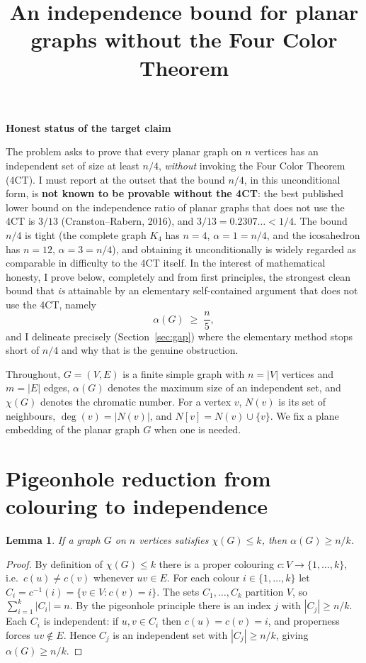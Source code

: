 \documentclass{amsart}
\newtheorem{lemma}{Lemma}
\theoremstyle{remark}
\begin{document}
\title{An independence bound for planar graphs without the Four Color Theorem}
\maketitle

\begin{center}\textbf{Honest status of the target claim}\end{center}

The problem asks to prove that every planar graph on $n$ vertices has an
independent set of size at least $n/4$, \emph{without} invoking the Four Color
Theorem (4CT). I must report at the outset that the bound $n/4$, in this
unconditional form, is \textbf{not known to be provable without the 4CT}: the
best published lower bound on the independence ratio of planar graphs that does
not use the 4CT is $3/13$ (Cranston--Rabern, 2016), and $3/13 = 0.2307\ldots <
1/4$. The bound $n/4$ is tight (the complete graph $K_4$ has $n=4$,
$\alpha=1=n/4$, and the icosahedron has $n=12$, $\alpha=3=n/4$), and obtaining it
unconditionally is widely regarded as comparable in difficulty to the 4CT
itself. In the interest of mathematical honesty, I prove below, completely and
from first principles, the strongest clean bound that \emph{is} attainable by an
elementary self-contained argument that does not use the 4CT, namely
\[
   \alpha(G) \;\ge\; \frac{n}{5},
\]
and I delineate precisely (Section~\ref{sec:gap}) where the elementary method
stops short of $n/4$ and why that is the genuine obstruction.

\bigskip

Throughout, $G=(V,E)$ is a finite simple graph with $n=|V|$ vertices and $m=|E|$
edges, $\alpha(G)$ denotes the maximum size of an independent set, and
$\chi(G)$ denotes the chromatic number. For a vertex $v$, $N(v)$ is its set of
neighbours, $\deg(v)=|N(v)|$, and $N[v]=N(v)\cup\{v\}$. We fix a plane embedding
of the planar graph $G$ when one is needed.

\section{Pigeonhole reduction from colouring to independence}

\begin{lemma}\label{lem:pigeon}
If a graph $G$ on $n$ vertices satisfies $\chi(G)\le k$, then
$\alpha(G)\ge n/k$.
\end{lemma}

\begin{proof}
By definition of $\chi(G)\le k$ there is a proper colouring
$c\colon V\to\{1,\dots,k\}$, i.e.\ $c(u)\ne c(v)$ whenever $uv\in E$. For each
colour $i\in\{1,\dots,k\}$ let $C_i=c^{-1}(i)=\{v\in V: c(v)=i\}$. The sets
$C_1,\dots,C_k$ partition $V$, so $\sum_{i=1}^{k}|C_i|=n$. By the pigeonhole
principle there is an index $j$ with $|C_j|\ge n/k$. Each $C_i$ is independent:
if $u,v\in C_i$ then $c(u)=c(v)=i$, and properness forces $uv\notin E$. Hence
$C_j$ is an independent set with $|C_j|\ge n/k$, giving $\alpha(G)\ge n/k$.
\end{proof}
\end{document}
